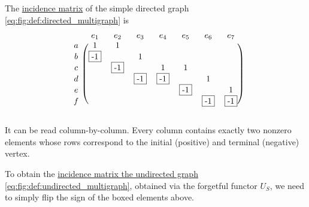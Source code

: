 \begin{example}\label{ex:incidence_matrices}
  The \hyperref[def:directed_incidence_matrix]{incidence matrix} of the simple directed graph \eqref{eq:fig:def:directed_multigraph} is
  \begin{equation}\label{eq:ex:incidence_matrices/directed}
    \begin{blockarray}{cccccccc}
        & e_1       & e_2       & e_3       & e_4       & e_5       & e_6       & e_7       \\
      \begin{block}{c(ccccccc)}
      a & 1         & 1         &           &           &           &           &           \\
      b & \fbox{-1} &           & 1         &           &           &           &           \\
      c &           & \fbox{-1} &           & 1         & 1         &           &           \\
      d &           &           & \fbox{-1} & \fbox{-1} &           & 1         &           \\
      e &           &           &           &           & \fbox{-1} &           & 1         \\
      f &           &           &           &           &           & \fbox{-1} & \fbox{-1} \\
      \end{block}
    \end{blockarray}
  \end{equation}

  It can be read column-by-column. Every column contains exactly two nonzero elements whose rows correspond to the initial (positive) and terminal (negative) vertex.

  To obtain the \hyperref[def:undirected_incidence_matrix]{incidence matrix the undirected graph} \eqref{eq:fig:def:undirected_multigraph}, obtained via the forgetful functor \hyperref[def:graph_functors/multi_forgetful]{\( U_S \)}, we need to simply flip the sign of the boxed elements above.
\end{example}
